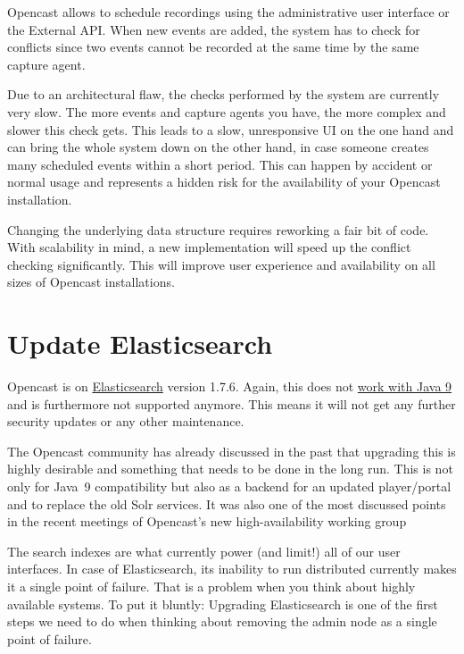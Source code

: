 \documentclass[a4paper]{article}
\begin{document}
Opencast allows to schedule recordings using the administrative user
interface or the External API. When new events are added, the system
has to check for conflicts since two events cannot be recorded at the
same time by the same capture agent.

Due to an architectural flaw, the checks performed by the system are
currently very slow. The more events and capture agents you have, the
more complex and slower this check gets. This leads to a slow,
unresponsive UI on the one hand and can bring the whole system down on
the other hand, in case someone creates many scheduled events within a
short period. This can happen by accident or normal usage and
represents a hidden risk for the availability of your Opencast
installation.

Changing the underlying data structure requires reworking a fair bit of
code. With scalability in mind, a new implementation will speed up the
conflict checking significantly. This will improve user experience and
availability on all sizes of Opencast installations.


\section*{Update Elasticsearch}

Opencast is on
\href{https://www.elastic.co/products/elasticsearch}{Elasticsearch} version
1.7.6. Again, this does not
\href{https://www.elastic.co/support/matrix#matrix_jvm}{work with Java 9} and
is furthermore not supported anymore. This means it will not get any further
security updates or any other maintenance.

The Opencast community has already discussed in the past that upgrading
this is highly desirable and something that needs to be done in the
long run. This is not only for Java~9 compatibility but also as a
backend for an updated player/portal and to replace the old Solr
services. It was also one of the most discussed points in the recent
meetings of Opencast's new high-availability working group

The search indexes are what currently power (and limit!) all of our
user interfaces. In case of Elasticsearch, its inability to run
distributed currently makes it a single point of failure. That is a
problem when you think about highly available systems. To put it
bluntly: Upgrading Elasticsearch is one of the first steps we need to
do when thinking about removing the admin node as a single point of
failure.
\end{document}
